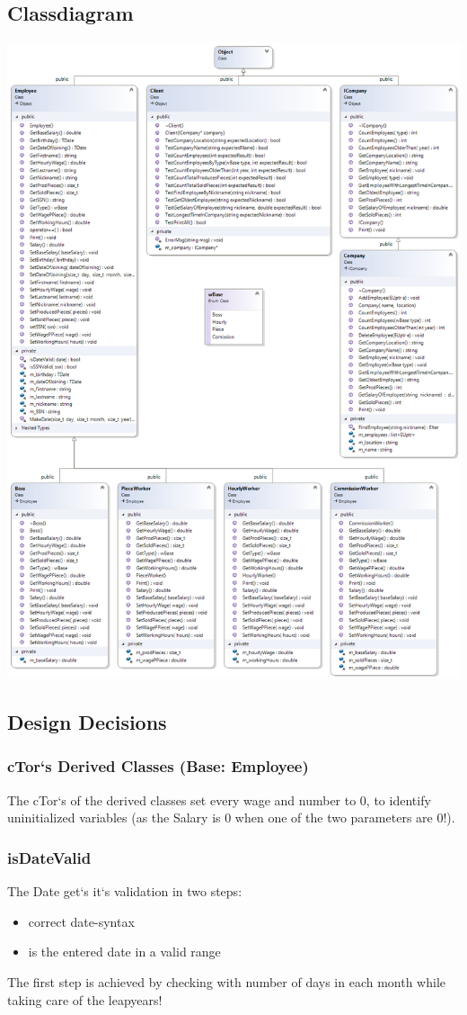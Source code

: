 \subsection{Classdiagram}
\includegraphics[scale=0.6]{ClassDiagram}

\subsection{Design Decisions}
\subsubsection{cTor`s Derived Classes (Base: Employee)}
The cTor`s of the derived classes set every wage and number to 0, to identify uninitialized variables (as the Salary is 0 when one of the two parameters are 0!).
\subsubsection{isDateValid}
The Date get`s it`s validation in two steps:
\begin{itemize}
	\item correct date-syntax
	\item is the entered date in a valid range
\end{itemize}
The first step is achieved by checking with number of days in each month while taking care of the leapyears!

